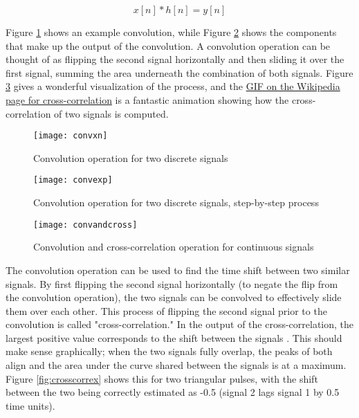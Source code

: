 \documentclass[12pt,a4paper]{report}
\begin{document}
\begin{equation} \label{eq:3eq1}
x[n] * h[n] = y[n]
\end{equation}

Figure \ref{fig:convxn} shows an example convolution, while Figure \ref{fig:convexp} shows the components that make up the output of the convolution. A convolution operation can be thought of as flipping the second signal horizontally and then sliding it over the first signal, summing the area underneath the combination of both signals. Figure \ref{fig:convandcross} gives a wonderful visualization of the process, and the \href{https://en.wikipedia.org/wiki/Cross-correlation#/media/File:Cross_correlation_animation.gif}{GIF on the Wikipedia page for cross-correlation} is a fantastic animation showing how the cross-correlation of two signals is computed. 

\begin{figure}[htbp]
	\centering
	\texttt{[image: convxn]}
	\caption{Convolution operation for two discrete signals \cite{dspguide}}
	\label{fig:convxn}
\end{figure}

\begin{figure}[htbp]
	\centering
	\texttt{[image: convexp]}
	\caption{Convolution operation for two discrete signals, step-by-step process \cite{dspguide}}
	\label{fig:convexp}
\end{figure}

\begin{figure}[htbp]
	\centering
	\texttt{[image: convandcross]}
	\caption{Convolution and cross-correlation operation for continuous signals \cite{wikicross}}
	\label{fig:convandcross}
\end{figure}

The convolution operation can be used to find the time shift between two similar signals. By first flipping the second signal horizontally (to negate the flip from the convolution operation), the two signals can be convolved to effectively slide them over each other. This process of flipping the second signal prior to the convolution is called "cross-correlation." In the output of the cross-correlation, the largest positive value corresponds to the shift between the signals \cite{dspguide}. This should make sense graphically; when the two signals fully overlap, the peaks of both align and the area under the curve shared between the signals is at a maximum. Figure \ref{fig:crosscorrex} shows this for two triangular pulses, with the shift between the two being correctly estimated as -0.5 (signal 2 lags signal 1 by 0.5 time units).
\end{document}
